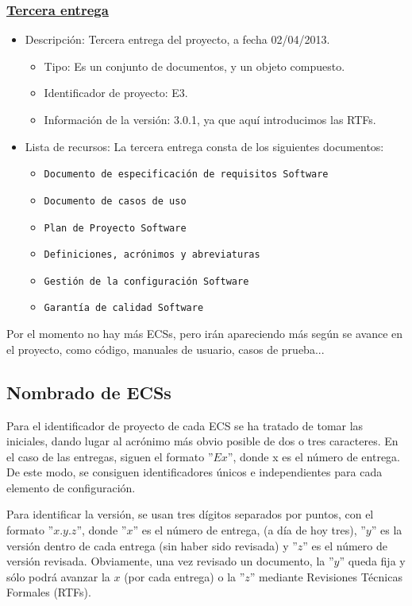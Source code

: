 \documentclass[spanish,a4paper,11pt, twoside]{report}	%
\begin{document}
			\subsubsection{\underline{Tercera entrega}}
			\begin{itemize}	
				\item{Descripción:} Tercera entrega del proyecto, a fecha 02/04/2013.
					\begin{itemize}	
						\item{Tipo:} Es un conjunto de documentos, y un objeto compuesto.
						\item{Identificador de proyecto:} E3.
						\item{Información de la versión:} 3.0.1, ya que aquí introducimos las RTFs.
					\end{itemize}	
				\item{Lista de recursos:} La tercera entrega consta de los siguientes documentos:
					\begin{itemize}	
						\item \texttt{Documento de especificación de requisitos Software}
						\item \texttt{Documento de casos de uso}
						\item \texttt{Plan de Proyecto Software}
						\item \texttt{Definiciones, acrónimos y abreviaturas}
						\item \texttt{Gestión de la configuración Software}
						\item \texttt{Garantía de calidad Software}
					\end{itemize}
			\end{itemize}	

			Por el momento no hay más ECSs, pero irán apareciendo más según se avance en el proyecto, como código, manuales de usuario, casos de prueba...

		\subsection{Nombrado de ECSs}

		Para el identificador de proyecto de cada ECS se ha tratado de tomar las iniciales, dando lugar al acrónimo más obvio posible de dos o tres caracteres. En el caso de las entregas, siguen el formato ''$Ex$'', donde x es el número de entrega. De este modo, se consiguen identificadores únicos e independientes para cada elemento de configuración.

		Para identificar la versión, se usan tres dígitos separados por puntos, con el formato ''$x.y.z$'', donde ''$x$'' es el número de entrega, (a día de hoy tres), ''$y$'' es la versión dentro de cada entrega (sin haber sido revisada) y ''$z$'' es el número de versión revisada. Obviamente, una vez revisado un documento, la ''$y$'' queda fija y sólo podrá avanzar la $x$ (por cada entrega) o la ''$z$'' mediante Revisiones Técnicas Formales (RTFs).
		
\end{document}
